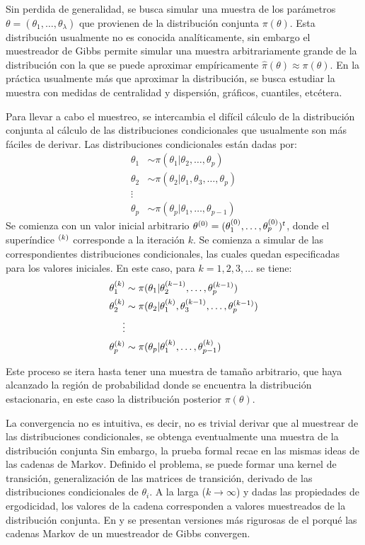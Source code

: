 \documentclass[../Main/Main.tex]{subfiles}
\begin{document}
Sin perdida de generalidad, se busca simular una muestra de los parámetros $\theta = (\theta_1,\ldots,\theta_\lambda)$ que provienen de la distribución conjunta $\pi(\theta)$. Esta distribución usualmente no es conocida analíticamente, sin embargo el muestreador de Gibbs permite simular una muestra arbitrariamente grande de la distribución con la que se puede aproximar empíricamente $\hat{\pi}(\theta) \approx \pi(\theta)$. En la práctica usualmente más que aproximar la distribución, se busca estudiar la muestra con medidas de centralidad y dispersión, gráficos, cuantiles, etcétera.

Para llevar a cabo el muestreo, se intercambia el difícil cálculo de la distribución conjunta al cálculo de las distribuciones condicionales que usualmente son más fáciles de derivar. Las distribuciones condicionales están dadas por: 
\begin{align}
	\theta_1 &\sim \pi(\theta_1|\theta_2,\ldots,\theta_p) \label{ec:DistCondicionales}\\
	\theta_2 &\sim \pi(\theta_2|\theta_1,\theta_3,\ldots,\theta_p)\nonumber \\ 
	\vdots \nonumber\\
	\theta_p &\sim \pi(\theta_p|\theta_1,\ldots,\theta_{p-1}) \nonumber
\end{align}
Se comienza con un valor inicial arbitrario $\theta^{(0)} = (\theta_1^{(0)},\ldots,\theta_p^{(0)})^t$, donde el superíndice $^{(k)}$ corresponde a la iteración $k$. Se comienza a simular de las correspondientes distribuciones condicionales, las cuales quedan especificadas para los valores iniciales. En este caso, para $k = 1,2,3,\ldots$ se tiene:
\begin{align}
	\theta_1^{(k)} &\sim \pi(\theta_1|\theta_2^{(k-1)},\ldots,\theta_p^{(k-1)}) \label{ec:GibbsSampler}\\
	\theta_2^{(k)} &\sim \pi(\theta_2|\theta_1^{(k)},\theta_3^{(k-1)},\ldots,\theta_p^{(k-1)})\nonumber \\ 
	\vdots \nonumber\\
	\theta_p^{(k)} &\sim \pi(\theta_p|\theta_1^{(k)},\ldots,\theta_{p-1}^{(k)}) \nonumber
\end{align}

Este proceso se itera hasta tener una muestra de tamaño arbitrario, que haya alcanzado la región de probabilidad donde se encuentra la distribución estacionaria, en este caso la distribución posterior $\pi(\theta)$.

La convergencia no es intuitiva, es decir, no es trivial derivar que al muestrear de las distribuciones condicionales, se obtenga eventualmente  una muestra de la distribución conjunta  Sin embargo, la prueba formal recae en  las mismas ideas de las cadenas de Markov. Definido el problema, se puede formar una kernel de transición, generalización de las matrices de transición, derivado de las  distribuciones condicionales de $\theta_i$. A la larga ($k \rightarrow \infty$) y dadas las propiedades de ergodicidad, los valores de la cadena corresponden a valores muestreados de la distribución conjunta. En \citet{casella1992explaining} y \citet{tierney1994markov} se presentan versiones más rigurosas de el porqué las cadenas Markov de un muestreador de Gibbs convergen. 
\end{document}
